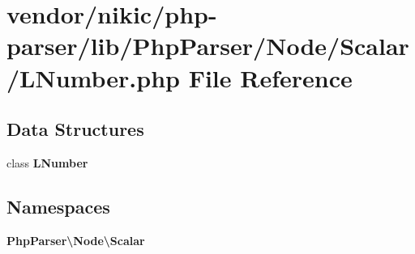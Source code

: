 \section{vendor/nikic/php-\/parser/lib/\+Php\+Parser/\+Node/\+Scalar/\+L\+Number.php File Reference}
\label{_l_number_8php}
\subsection*{Data Structures}
\begin{DoxyCompactItemize}
\item 
class {\bf L\+Number}
\end{DoxyCompactItemize}
\subsection*{Namespaces}
\begin{DoxyCompactItemize}
\item 
 {\bf Php\+Parser\textbackslash{}\+Node\textbackslash{}\+Scalar}
\end{DoxyCompactItemize}
